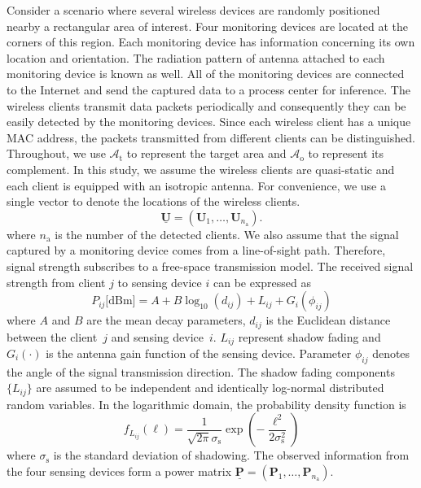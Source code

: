 Consider a scenario where several wireless devices are randomly positioned nearby a rectangular area of interest.
Four monitoring devices are located at the corners of this region.
Each monitoring device has information concerning its own location and orientation.
The radiation pattern of antenna attached to each monitoring device is known as well.
All of the monitoring devices are connected to the Internet and send the captured data to a process center for inference.
The wireless clients transmit data packets periodically and consequently they can be easily detected by the monitoring devices.
Since each wireless client has a unique MAC address, the packets transmitted from different clients can be distinguished.
Throughout, we use $\mathcal{A}_{\mathrm{t}}$ to represent the target area and $\mathcal{A}_{\mathrm{o}}$ to represent its complement.
In this study, we assume the wireless clients are quasi-static and each client is equipped with an isotropic antenna.
For convenience, we use a single vector to denote the locations of the wireless clients.
\begin{equation}
\underline{\mathbf{U}} = (\mathbf{U}_1, \ldots, \mathbf{U}_{n_{\mathrm{a}}}).
\end{equation}
where $n_{\mathrm{a}}$ is the number of the detected clients.
We also assume that the signal captured by a monitoring device comes from a line-of-sight path.
Therefore, signal strength subscribes to a free-space transmission model.
The received signal strength from client $j$ to sensing device $i$ can be expressed as
\begin{equation} 
P_{ij} \text{[dBm]}
= A + B \log_{10}(d_{ij}) + L_{ij} + G_i (\phi_{ij})
\end{equation}
where $A$ and $B$ are the mean decay parameters, $d_{ij}$ is the Euclidean distance between the client~$j$ and sensing device~$i$.
$L_{ij}$ represent shadow fading and $G_i (\cdot)$ is the antenna gain function of the sensing device.
Parameter $\phi_{ij}$ denotes the angle of the signal transmission direction.
The shadow fading components $\{ L_{ij} \}$ are assumed to be independent and identically log-normal distributed random variables.
In the logarithmic domain, the probability density function is
\begin{equation} 
f_{L_{ij}} (\ell)
= \frac{1}{\sqrt{2 \pi} \sigma_{\mathrm{s}}} 
\exp \left( - \frac{\ell^2}{2 \sigma_{\mathrm{s}}^2} \right)
\end{equation}
where $\sigma_{\mathrm{s}}$ is the standard deviation of shadowing.
The observed information from the four sensing devices form a power matrix $\underline{\mathbf{P}} = (\mathbf{P}_1, \ldots, \mathbf{P}_{n_{\mathrm{a}}})$.
